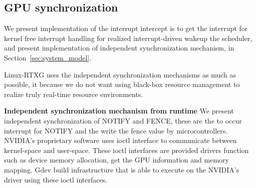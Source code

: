 \subsection{GPU synchronization}
We present implementation of the interrupt intercept is to get the interrupt for kernel free interrupt handling for realized interrupt-driven wakeup the scheduler, and present implementation of independent synchronization mechanism, in Section~\ref{sec:system_model}.

Linux-RTXG uses the independent synchronization mechanisms as much as possible,
it because we do not want using black-box resource management to realize truly real-time resource environments.


\textbf{Independent synchronization mechanism from runtime}
We present independent synchronization of NOTIFY and FENCE, these are the to occur interrupt for NOTIFY and the write the fence value by microcontrollers.
NVIDIA's proprietary software uses ioctl interface to communicate between kernel-space and user-space.
These ioctl interfaces are provided drivers function such as device memory allocation, get the GPU information and memory mapping.
Gdev build infrastructure that is able to execute on the NVIDIA's driver using these ioctl interfaces.

